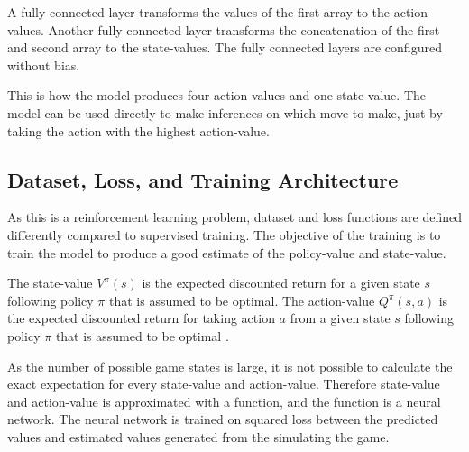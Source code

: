 A fully connected layer transforms the values of the first array to the action-values. Another fully connected layer transforms the concatenation of the first and second array to the state-values. The fully connected layers are configured without bias.

This is how the model produces four action-values and one state-value. The model can be used directly to make inferences on which move to make, just by taking the action with the highest action-value.






\subsection{Dataset, Loss, and Training Architecture}
\label{subsection_dataset_and_training}

As this is a reinforcement learning problem, dataset and loss functions are defined differently compared to supervised training. The objective of the training is to train the model to produce a good estimate of the policy-value and state-value.

The state-value $V^\pi(s)$ is the expected discounted return for a given state $s$ following policy $\pi$ that is assumed to be optimal. The action-value $Q^\pi(s,a)$ is the expected discounted return for taking action $a$ from a given state $s$ following policy $\pi$ that is assumed to be optimal \cite{blog_reinforcement_learning}.

As the number of possible game states is large, it is not possible to calculate the exact expectation for every state-value and action-value. Therefore state-value and action-value is approximated with a function, and the function is a neural network. The neural network is trained on squared loss \cite{blog_reinforcement_learning} between the predicted values and estimated values generated from the simulating the game.

